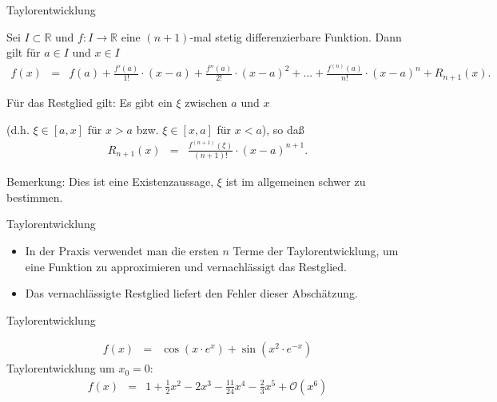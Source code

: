 \documentclass[german]{beamer}
\newcommand{\bq}{\begin{eqnarray*}}
\newcommand{\eq}{\end{eqnarray*}}
\begin{document}
\begin{frame}{Taylorentwicklung}

\begin{theorem}
Sei $I \subset \mathbb R$ und $f : I \rightarrow \mathbb R$ eine
$(n+1)$-mal stetig differenzierbare Funktion. Dann gilt f\"ur $a \in I$ und $x\in I$
{\footnotesize
\bq
 f(x) & = &
  f(a) + \frac{f'(a)}{1!} \cdot (x-a) + \frac{f''(a)}{2!} \cdot (x-a)^2 
  + ... + \frac{f^{(n)}(a)}{n!} \cdot (x-a)^n + R_{n+1}(x).
\eq
}

\vspace*{-2mm}
F\"ur das Restglied gilt:
Es gibt ein $\xi$ zwischen $a$ und $x$ 

(d.h. $\xi \in [a,x]$ f\"ur $x>a$ bzw. $\xi \in [x,a]$ f\"ur $x<a$), so da{\ss}
{\footnotesize
\bq
 R_{n+1}(x) & = & \frac{f^{(n+1)}(\xi)}{(n+1)!} \cdot (x-a)^{n+1}.
\eq
}

\vspace*{-2mm}
Bemerkung: Dies ist eine Existenzaussage, $\xi$ ist im allgemeinen schwer zu bestimmen.
\end{theorem}

\end{frame}

\begin{frame}{Taylorentwicklung}

\begin{itemize}
\item In der Praxis verwendet man die ersten $n$ Terme der Taylorentwicklung, um eine Funktion zu approximieren
und vernachl\"assigt das Restglied. 

\item Das vernachl\"assigte Restglied liefert den Fehler dieser Absch\"atzung.
\end{itemize}

\end{frame}

\begin{frame}{Taylorentwicklung}

\begin{example}
\bq
 f\left(x\right) & = & \cos\left( x \cdot e^x \right) + \sin\left( x^2 \cdot e^{-x} \right)
\eq
Taylorentwicklung um $x_0=0$:
\bq
 f\left(x\right) & = & 
 1 + \frac{1}{2} x^2 - 2 x^3 - \frac{11}{24} x^4 - \frac{2}{3} x^5 + \mathcal{O}\left(x^6\right)
\eq
\end{example}

\end{frame}
\end{document}
